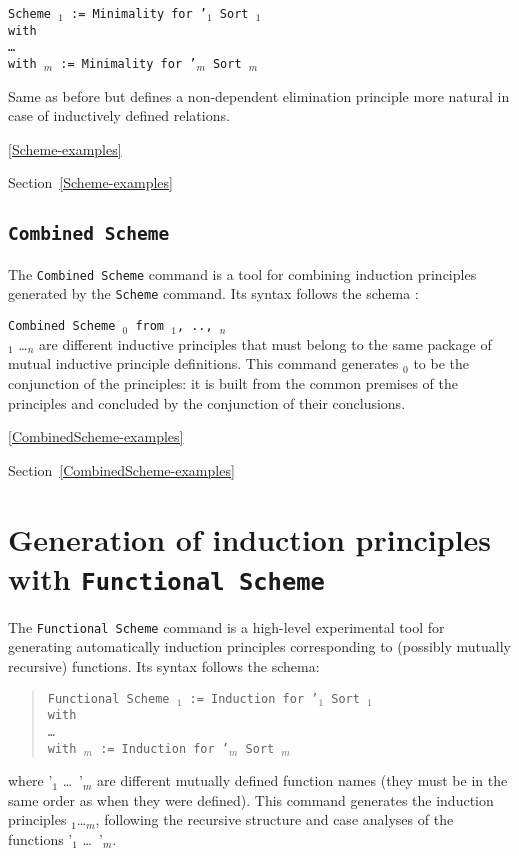 \begin{Variants}
\item {\tt Scheme {\ident$_1$} := Minimality for \ident'$_1$ Sort {\sort$_1$} \\
    with\\
    \mbox{}\hspace{0.1cm} \dots\ \\
    with {\ident$_m$} := Minimality for {\ident'$_m$} Sort
    {\sort$_m$}}

  Same as before but defines a non-dependent elimination principle more
  natural in case of inductively defined relations. 
\end{Variants}

\SeeAlso \ref{Scheme-examples}

\SeeAlso Section~\ref{Scheme-examples}

\subsection{\tt Combined Scheme\label{CombinedScheme}
}
The {\tt Combined Scheme} command is a tool for combining 
induction principles generated by the {\tt Scheme} command.
Its syntax follows the schema :

\noindent
{\tt Combined Scheme {\ident$_0$} from {\ident$_1$}, .., {\ident$_n$}}\\
\ident$_1$ \ldots \ident$_n$ are different inductive principles that must belong to
the same package of mutual inductive principle definitions. This command
generates {\ident$_0$} to be the conjunction of the principles: it is
built from the common premises of the principles and concluded by the
conjunction of their conclusions.

\SeeAlso \ref{CombinedScheme-examples}

\SeeAlso Section~\ref{CombinedScheme-examples}

\section{Generation of induction principles with {\tt Functional Scheme}
\label{FunScheme}
}

The {\tt Functional Scheme} command is a high-level experimental
tool for generating automatically induction principles
corresponding to (possibly mutually recursive) functions.  Its
syntax follows the schema:
\begin{quote}
{\tt Functional Scheme {\ident$_1$} := Induction for \ident'$_1$ Sort {\sort$_1$} \\
  with\\
  \mbox{}\hspace{0.1cm} \dots\ \\
        with {\ident$_m$} := Induction for {\ident'$_m$} Sort
        {\sort$_m$}}
\end{quote}  
where \ident'$_1$ \dots\ \ident'$_m$ are different mutually defined function
names (they must be in the same order as when they were defined).
This command generates the induction principles
\ident$_1$\dots\ident$_m$, following the recursive structure and case
analyses of the functions \ident'$_1$ \dots\ \ident'$_m$.


